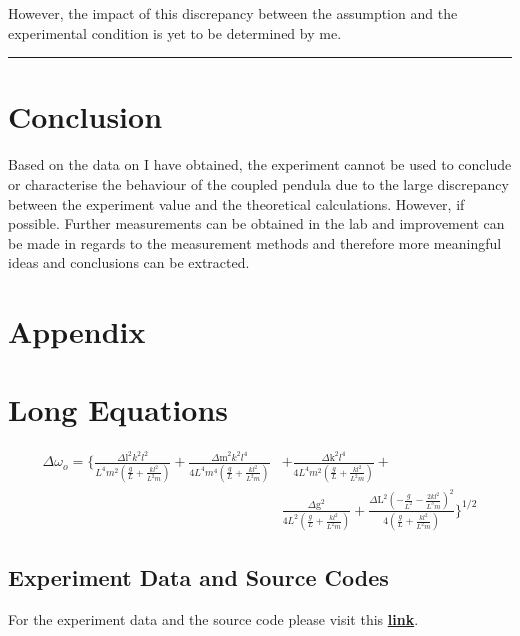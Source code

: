 \documentclass[aps,prl,reprint,10pt,amsmath,amssymb,superscriptaddress,a4paper]{revtex4-2}
\begin{document}
However, the impact of this discrepancy between the assumption and the experimental condition is yet to be determined by me.
\par\noindent\rule{\linewidth}{0.4pt}

\section{Conclusion}
Based on the data on I have obtained, the experiment cannot be used to conclude or characterise the behaviour of the coupled pendula due to the large discrepancy between the experiment value and the theoretical calculations. However, if possible. Further measurements can be obtained in the lab and improvement can be made in regards to the measurement methods and therefore more meaningful ideas and conclusions can be extracted.








\newpage


\onecolumngrid
\newpage
\appendix
\section{Appendix}
\section{Long Equations}\label{LE}
\begin{equation}
    \begin{split}
        \Delta \omega_o = \Biggl\{\frac{\text{$\Delta $l}^2 k^2 l^2}{L^4 m^2 \left(\frac{g}{L}+\frac{k l^2}{L^2 m}\right)}+\frac{\text{$\Delta $m}^2 k^2 l^4}{4 L^4 m^4 \left(\frac{g}{L}+\frac{k l^2}{L^2 m}\right)}&+\frac{\text{$\Delta $k}^2 l^4}{4 L^4 m^2 \left(\frac{g}{L}+\frac{k l^2}{L^2 m}\right)}+\\
        &\frac{\text{$\Delta $g}^2}{4 L^2 \left(\frac{g}{L}+\frac{k l^2}{L^2 m}\right)}+\frac{\text{$\Delta $L}^2 \left(-\frac{g}{L^2}-\frac{2 k l^2}{L^3 m}\right)^2}{4 \left(\frac{g}{L}+\frac{k l^2}{L^2 m}\right)}\Biggr\}^{1/2} \label{eq7}
    \end{split}
\end{equation}
\subsection{Experiment Data and Source Codes}
For the experiment data and the source code please visit this \href{https://github.com/jojounderscorejo/CheatSheetRepo/tree/main/Otherthings/PHYS2113%20CP%20LAB}{\textbf{link}}.
\end{document}
